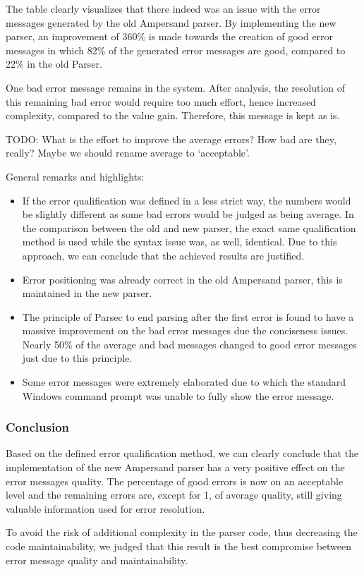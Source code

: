 The table clearly visualizes that there indeed was an issue with the error messages generated by the old Ampersand parser.
By implementing the new parser, an improvement of 360\% is made towards the creation of good error messages in which 82\% of the generated error messages are good, compared to 22\% in the old Parser.

One bad error message remains in the system.
After analysis, the resolution of this remaining bad error would require too much effort, hence increased complexity, compared to the value gain.
Therefore, this message is kept as is.

TODO: What is the effort to improve the average errors? How bad are they, really? Maybe we should rename average to `acceptable'.

General remarks and highlights:
 \begin{itemize}
	\item 	If the error qualification was defined in a less strict way, the numbers would be slightly different as some bad errors would be judged as being average. 
		In the comparison between the old and new parser, the exact same qualification method is used while the syntax issue was, as well, identical.
		Due to this approach, we can conclude that the achieved results are justified.
	\item 	Error positioning was already correct in the old Ampersand parser, this is maintained in the new parser.
	\item 	The principle of Parsec to end parsing after the first error is found to have a massive improvement on the bad error messages due the conciseness issues.
		Nearly 50\% of the average and bad messages changed to good error messages just due to this principle.
	\item 	Some error messages were extremely elaborated due to which the standard Windows command prompt was unable to fully show the error message.
\end {itemize}

\subsubsection{Conclusion}
Based on the defined error qualification method, we can clearly conclude that the implementation of the new Ampersand parser has a very positive effect on the error messages quality.
The percentage of good errors is now on an acceptable level and the remaining errors are, except for 1, of average quality, still giving valuable information used for error resolution.

To avoid the risk of additional complexity in the parser code, thus decreasing the code maintainability, we judged that this result is  the best compromise between error message quality and maintainability.
